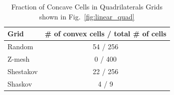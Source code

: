 \documentclass[preprint,10pt]{elsarticle}
\newcommand{\fig}[1]{Fig.~\ref{#1}}                      %
\begin{document}
\begin{table}[htbp]
	\centering
		\begin{tabular}{|l||c|}
		\hline
		Grid      & \# of convex cells / total \# of cells \\ \hline\hline
		Random    & 54 / 256 \\ \hline
		Z-mesh    &  0 / 400 \\ \hline
		Shestakov & 22 / 256 \\ \hline
		Shaskov   &  4 /   9 \\ \hline		
		\end{tabular}
	\caption{Fraction of Concave Cells in Quadrilaterals Grids shown in \fig{fig:linear_quad}}
	\label{tab:FractionOfConcaveCellsInQuadrilateralsGridsShownInFigFig}
\end{table}

\pagebreak
\end{document}
